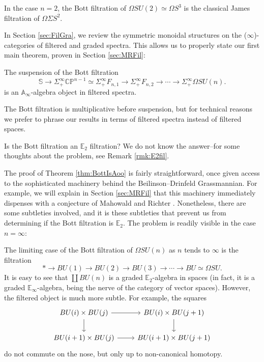 \begin{exm}
In the case $n=2$, the Bott filtration of $\Omega SU(2) \simeq \Omega S^3$ is the classical James filtration of $\Omega \Sigma S^2$.
\end{exm}

In Section \ref{sec:FilGra}, we review the symmetric monoidal structures on the ($\infty$)-categories of filtered and graded spectra.  This allows us to properly state our first main theorem, proven in Section \ref{sec:MRFil}:

\begin{thm} \label{thm:BottIsAoo}
The suspension of the Bott filtration 
$$\mathbb{S} \longrightarrow \Sigma_+^{\infty} \mathbb{CP}^{n-1} \simeq \Sigma_+^{\infty} F_{n,1} \longrightarrow \Sigma_+^{\infty} F_{n,2} \longrightarrow \cdots \longrightarrow \Sigma^{\infty}_+ \Omega SU(n).$$
is an $\mathbb{A}_\infty$-algebra object in filtered spectra.
\end{thm}

\begin{rmk}
The Bott filtration is multiplicative before suspension, but for technical reasons we prefer to phrase our results in terms of filtered spectra instead of filtered spaces.
\end{rmk}

\begin{qst} \label{qst:BottE2}
Is the Bott filtration an $\mathbb{E}_2$ filtration?  We do not know the answer--for some thoughts about the problem, see Remark \ref{rmk:E2fil}.
\end{qst}

The proof of Theorem \ref{thm:BottIsAoo} is fairly straightforward, once given access to the sophisticated machinery behind the Beilinson--Drinfeld Grassmannian.  For example, we will explain in Section \ref{sec:MRFil} that this machinery immediately dispenses with a conjecture of Mahowald and Richter \cite{MahowaldRichter}.  Nonetheless, there are some subtleties involved, and it is these subtleties that prevent us from determining if the Bott filtration is $\mathbb{E}_2$.  The problem is readily visible in the case $n=\infty$:

\begin{exm}
The limiting case of the Bott filtration of $\Omega SU(n)$ as $n$ tends to $\infty$ is the filtration
$$* \longrightarrow BU(1) \longrightarrow BU(2) \longrightarrow BU(3) \longrightarrow \cdots \longrightarrow BU \simeq \Omega SU.$$
It is easy to see that $\coprod BU(n)$ is a graded $\mathbb{E}_2$-algebra in spaces (in fact, it is a graded $\mathbb{E}_\infty$-algebra, being the nerve of the category of vector spaces).  However, the filtered object is much more subtle.  For example, the squares
$$
\begin{tikzcd}
BU(i) \times BU(j) \arrow{d} \arrow{r} & BU(i) \times BU(j+1) \arrow{d} \\
BU(i+1) \times BU(j) \arrow{r} & BU(i+1) \times BU(j+1)
\end{tikzcd}
$$
do not commute on the nose, but only up to non-canonical homotopy.
\end{exm}


